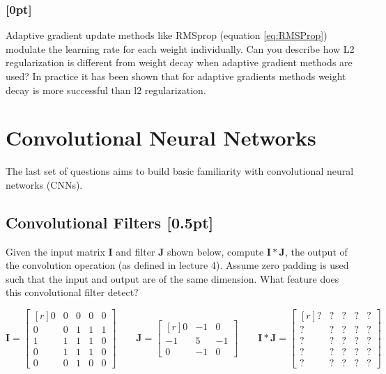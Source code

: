     \subsubsection{[0pt] \LI}
    Adaptive gradient update methods like RMSprop (equation \ref{eq:RMSProp}) modulate the learning rate for each weight individually. Can you describe how L2 regularization is different from weight decay when adaptive gradient methods are used? In practice it has been shown that for adaptive gradients methods weight decay is more successful than l2 regularization.\\

    
\section{Convolutional Neural Networks}
The last set of questions aims to build basic familiarity with convolutional neural networks (CNNs). 

\subsection{Convolutional Filters {\color{blue}[0.5pt] \LIV}} \label{sec:filter}
Given the input matrix $\mathbf{I}$ and filter $\mathbf{J}$ shown below, compute $\mathbf{I * J}$, the output of the convolution operation (as defined in lecture 4). Assume zero padding is used such that the input and output are of the same dimension. What feature does this convolutional filter detect?

\begin{equation*}
\mathbf{I} = \begin{bmatrix*}[r]
0 & 0 & 0 & 0 & 0 \\
0 & 0 & 1 & 1 & 1 \\
1 & 1 & 1 & 1 & 0 \\
0 & 1 & 1 & 1 & 0 \\
0 & 0 & 1 & 0 & 0
\end{bmatrix*}
\hspace{2em}
\mathbf{J} = \begin{bmatrix*}[r]
0 & -1 & 0 \\
-1 & 5 & -1 \\
0 & -1 & 0\
\end{bmatrix*}
\hspace{2em}
\mathbf{I * J} =  
\begin{bmatrix*}[r]
? & ? & ? & ? & ? \\
? & ? & ? & ? & ? \\
? & ? & ? & ? & ? \\
? & ? & ? & ? & ? \\
? & ? & ? & ? & ?
\end{bmatrix*}
\end{equation*}


